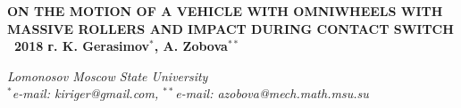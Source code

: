 \begin{center}
\large
\textbf{ ON THE MOTION OF A VEHICLE WITH OMNIWHEELS WITH MASSIVE ROLLERS AND IMPACT DURING CONTACT SWITCH \\
\textcopyright \ 2018 г. \quad K. Gerasimov$^{*}$, A. Zobova$^{**}$ }

\textit{ Lomonosov Moscow State University \\
$^*$e-mail: kiriger@gmail.com, $^{**}$e-mail: azobova@mech.math.msu.su }
\end{center}
